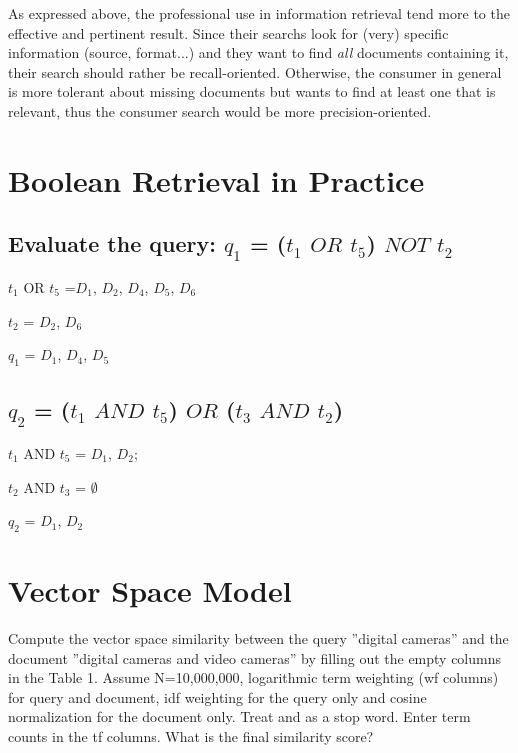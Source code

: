 \documentclass{scrartcl}
\begin{document}
As expressed above, the professional use in information retrieval tend more to the effective and pertinent result. Since their searchs look for (very) specific information (source, format...) and they want to find \textit{all} documents containing it, their search should rather be recall-oriented. Otherwise, the consumer in general is more tolerant about missing documents but wants to find at least one that is relevant, thus the consumer search would be more precision-oriented.

\section{Boolean Retrieval in Practice}

\subsection{Evaluate the query: $q_1$ = ($t_1$    $OR$    $t_5$)   $NOT$   $t_2$ }



  $t_1$     OR    $t_5$ =$ D_1$, $D_2$, $D_4$, $D_5$, $D_6$
 
  $t_2$ = $D_2$, $D_6$

  $q_1$ = $D_1$, $D_4$, $D_5$


\subsection{$q_2$ = ($t_1$     $AND$    $t_5$)    $ OR$     ($t_3$     $AND$    $t_2$)}


$t_1 $    AND    $t_5$ = $D_1$, $D_2$; 

$t_2$     AND   $t_3$ = $\emptyset $

$q_2$ = $D_1$, $D_2$

\section{Vector Space Model}

Compute the vector space similarity between the query ”digital cameras” and the document
”digital cameras and video cameras” by filling out the empty columns in the Table 1. Assume
N=10,000,000, logarithmic term weighting (wf columns) for query and document, idf weighting
for the query only and cosine normalization for the document only. Treat and as a stop word.
Enter term counts in the tf columns. What is the final similarity score?
\end{document}
